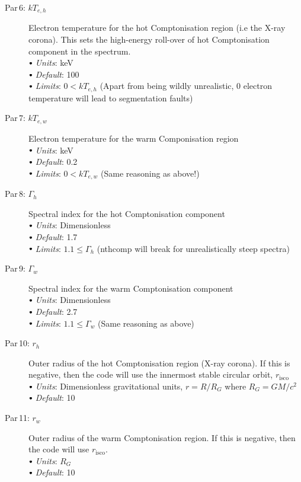 \documentclass[a4paper, 11pt, times, onecolumn]{article}
\newcommand{\kTh}{kT_{e, h}}
\newcommand{\kTw}{kT_{e, w}}
\newcommand{\risco}{r_{\mathrm{isco}}}
\newcommand{\sbt}{\,\begin{picture}(-1,1)(-1,-3)\circle*{3}\end{picture}\ }
\begin{document}
\begin{description}
	\item[Par\,6:\,\,$\kTh$] Electron temperature for the hot Comptonisation region (i.e the X-ray corona). This sets the high-energy roll-over of hot Comptonisation component in the spectrum. \\
		$\sbt$ {\it Units}: keV \\
		$\sbt$ {\it Default}: 100  \\
		$\sbt$ {\it Limits}: $0 < \kTh$ (Apart from being wildly unrealistic, 0 electron temperature will lead to segmentation faults) 
	
	\item[Par\,7:\,\,$\kTw$] Electron temperature for the warm Componisation region \\
		$\sbt$ {\it Units}: keV \\
		$\sbt$ {\it Default}: 0.2 \\
		$\sbt$ {\it Limits}: $0 < \kTw$ (Same reasoning as above!)
	
	\item[Par\,8:\,\,$\Gamma_{h}$] Spectral index for the hot Comptonisation component \\
		$\sbt$ {\it Units}: Dimensionless \\
		$\sbt$ {\it Default}: 1.7 \\
		$\sbt$ {\it Limits}: $1.1 \leq \Gamma_{h}$ ({\sc nthcomp} will break for unrealistically steep spectra)
	
	\item[Par\,9:\,\,$\Gamma_{w}$] Spectral index for the warm Comptonisation component \\
		$\sbt$ {\it Units}: Dimensionless \\
		$\sbt$ {\it Default}: 2.7 \\
		$\sbt$ {\it Limits}: $1.1 \leq \Gamma_{w}$ (Same reasoning as above)
	
	\item[Par\,10:\,\,$r_{h}$] Outer radius of the hot Comptonisation region (X-ray corona). If this is negative, then the code will use the innermost stable circular orbit, $\risco$ \\
		$\sbt$ {\it Units}: Dimensionless gravitational units, $r=R/R_{G}$ where $R_{G} = GM/c^{2}$ \\
		$\sbt$ {\it Default}: 10
	
	\item[Par\,11:\,\,$r_{w}$] Outer radius of the warm Comptonisation region. If this is negative, then the code will use $\risco$. \\
		$\sbt$ {\it Units}: $R_{G}$ \\
		$\sbt$ {\it Default}: 10
	

\end{description}
\end{document}
